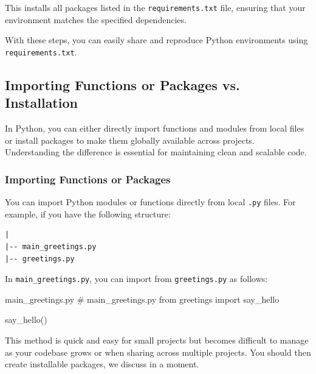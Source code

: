 This installs all packages listed in the \texttt{requirements.txt} file, ensuring that your environment matches the specified dependencies.

With these steps, you can easily share and reproduce Python environments using \texttt{requirements.txt}.

%
\subsection{Importing Functions or Packages vs. Installation}

In Python, you can either directly import functions and modules from local files or install packages to make them globally available across projects. Understanding the difference is essential for maintaining clean and scalable code.

%
\subsubsection{Importing Functions or Packages}


You can import Python modules or functions directly from local \texttt{.py} files. For example, if you have the following structure:

\begin{lstlisting}[basicstyle=\ttfamily\small]
|
|-- main_greetings.py
|-- greetings.py
\end{lstlisting}

In \texttt{main\_greetings.py}, you can import from \texttt{greetings.py} as follows:

\begin{codeonly}{main_greetings.py}
# main_greetings.py
from greetings import say_hello

say_hello()
\end{codeonly}

This method is quick and easy for small projects but becomes difficult to manage as your codebase grows or when sharing across multiple projects. You should then create installable packages, we discuss in a moment. 

%
